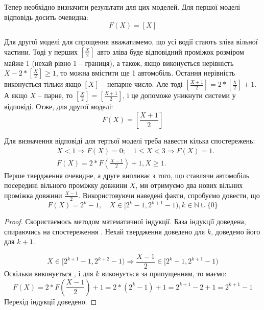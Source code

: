 Тепер необхідно визначити результати для цих моделей. Для першої моделі відповідь досить очевидна:
\begin{equation}
	\label{eq:upperbound}
	F(X)=[X]
\end{equation}

Для другої моделі для спрощення вважатимемо, що усі водії стають зліва вільної частини. Тоді у перших $[\frac X2]$ авто зліва буде відповідний проміжок розміром майже 1 (нехай рівно 1 – границя), а також, якщо виконується нерівність $X - 2 * [\frac X2] \geq 1$, то можна вмістити ще 1 автомобіль. Остання нерівність виконується тільки якщо $[X]$ – непарне число. Але тоді $[\frac{X+1}{2}] = 2 * [\frac{X}{2}] + 1$. А якщо $X$ – парне, то $[\frac{X}{2}] = [\frac{X+1}{2}]$, і це допоможе уникнути системи у відповіді. Отже, для другої моделі:
\begin{equation}
	\label{eq:lowerbound}
	F(X)=\left[\frac{X+1}{2}\right]
\end{equation}

Для визначення відповіді для тертьої моделі треба навести кілька спостережень:
\begin{align}
	&X < 1 \Rightarrow F(X)=0;\quad 1 \leq X < 3 \Rightarrow F(X) = 1.\label{eq:part_case_prop1}\\
	&F(X) = 2 * F\left(\frac{X-1}{2}\right) + 1, X \geq 1.\label{eq:part_case_prop2}
\end{align}
Перше твердження очевидне, а друге випливає з того, що ставлячи автомобіль посередині вільного проміжку довжини $X$, ми отримуємо два
нових вільних проміжка довжини $\frac{X-1}{2}$. Використовуючи наведені факти,
спробуємо довести, що
\begin{equation}
	F(X) = 2^k - 1,\quad X \in [2^k - 1, 2^{k+1} - 1), k \in \mathbb{N} \cup \{0\} \label{eq:part_case_res3}
\end{equation}
\begin{proof}
	Скористаємось методом математичної індукції. База індукції доведена, спираючись на спостереження . Нехай твердження доведено для $k$, доведемо його для $k+1$.
	
	\begin{equation}
		X \in [2^{k+1} - 1, 2^{k+2} - 1) \Rightarrow \frac{X-1}{2} \in [2^k - 1, 2^{k+1} - 1)
	\end{equation}
	Оскільки виконується , і для $k$ виконується  за припущенням, то маємо:
	\begin{equation}
		F(X) = 2 * F(\frac{X-1}{2}) + 1 = 2 * (2^k - 1) + 1 = 2^{k+1} - 2 + 1 = 2^{k+1} - 1
	\end{equation}
	Перехід індукції доведено.
\end{proof}